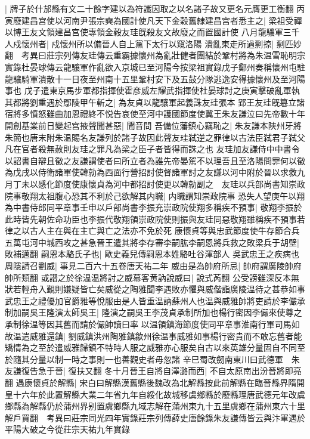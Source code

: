 |{
	牌子於什邡縣有文二十餘字建以為符讖因取之以名諸子故又更名元膺更工衡翻}
丙寅廢建昌宫使以河南尹張宗奭為國計使凡天下金穀舊隸建昌宫者悉主之|{
	梁祖受禪以博王友文領建昌宫使專領金穀友珪旣殺友文故廢之而置國計使}
八月龍驤軍三千人戍懷州者|{
	戍懷州所以備晉人自上黨下太行以窺洛陽}
潰亂東走所過剽掠|{
	剽匹妙翻　考異曰莊宗列傳友珪傳云重霸據懷州為亂壯健者團結於鞏村將為朱温雪恥明宗實錄杜晏球傳云龍驤軍作亂欲入京城已至河陽今按梁祖實錄戊子鄭州奏稱懷州屯駐龍驤騎軍潰散十一日夜至州南十五里鞏村安下及五鼔分隊逃逸安得據懷州及至河陽事也}
戊子遣東京馬步軍都指揮使霍彦威左耀武指揮使杜晏球討之庚寅擊破亂軍執其都將劉重遇於鄢陵甲午斬之|{
	為友貞以龍驤軍起義誅友珪張本}
郢王友珪旣簒立諸宿將多憤怒雖曲加恩禮終不悦告哀使至河中護國節度使冀王朱友謙泣曰先帝數十年開創基業前日變起宫掖聲聞甚惡|{
	聞音問}
吾備位藩鎮心竊恥之|{
	朱友謙本陜州牙將朱簡也唐末附朱温賜名友謙列於諸子故因此聲友珪弑逆之罪律以古法臣弑君子弑父凡在官者殺無赦則友珪之罪凡為梁之臣子者皆得而誅之也}
友珪加友謙侍中中書令以詔書自辯且徵之友謙謂使者曰所立者為誰先帝晏駕不以理吾且至洛陽問罪何以徵為戊戌以侍衛諸軍使韓勍為西面行營招討使督諸軍討之友謙以河中附於晉以求救九月丁未以感化節度使康懷貞為河中都招討使更以韓勍副之　友珪以兵部尚書知崇政院事敬翔太祖腹心恐其不利於己欲解其内職|{
	内職謂知崇政院事}
恐失人望庚午以翔為中書侍郎同平章事壬申以戶部尚書李振充崇政院使翔多稱疾不預事|{
	敬翔李振於此時皆先朝佐命功臣也李振代敬翔領崇政院使則振與友珪同惡敬翔雖稱疾不預事若律之以古人主在與在主亡與亡之法亦不免於死}
康懷貞等與忠武節度使牛存節合兵五萬屯河中城西攻之甚急晉王遣其將李存審李嗣肱李嗣恩將兵救之敗梁兵于胡壁|{
	敗補邁翻}
嗣恩本駱氏子也|{
	歐史義兒傳嗣恩本姓駱吐谷渾部人}
吳武忠王之疾病也周隱請召劉威|{
	事見二百六十五卷唐天祐二年}
威由是為帥府所忌|{
	帥府謂廣陵帥府帥所類翻}
或譛之於徐温温將討之威幕客黄訥說威曰|{
	說式芮翻}
公受謗雖深反本無狀若輕舟入覲則嫌疑皆亡矣威從之陶雅聞李遇敗亦懼與威偕詣廣陵温待之甚恭如事武忠王之禮優加官爵雅等悅服由是人皆重温訥蘇州人也温與威雅帥將吏請於李儼承制加嗣吳王隆演太師吳王|{
	隆演之嗣吳王李茂貞承制所加也楊行密因李儼來使尊之承制徐温等因其舊而請於儼帥讀曰率}
以温領鎮海節度使同平章事淮南行軍司馬如故温遣威雅還鎮|{
	劉威鎮洪州陶雅鎮歙州徐温事威雅如事楊行密貴而不敢忘舊者能矯情為之至於遣威雅歸鎮不特時人服之威雅亦心服矣自古以來英雄分量固自不同至於隨其分量以制一時之事則一也善觀史者毋忽諸}
辛巳蜀改劒南東川曰武德軍　朱友謙復告急于晉|{
	復扶又翻}
冬十月晉王自將自澤潞而西|{
	不自太原南出汾晉將即亮翻}
遇康懷貞於解縣|{
	宋白曰解縣漢舊縣後魏改為北解縣按此前解縣在臨晉縣界隋開皇十六年於此置解縣大業二年省九年自綏化故城移虞鄉縣於廢縣理唐武德元年改虞鄉縣為解縣仍於蒲州界别置虞鄉縣九域志解在蒲州東九十五里虞鄉在蒲州東六十里解戶買翻　考異曰莊宗同光四年實錄莊宗列傳薛史唐餘錄朱友謙傳皆云與汴軍遇於平陽大破之今從莊宗天祐九年實錄}
